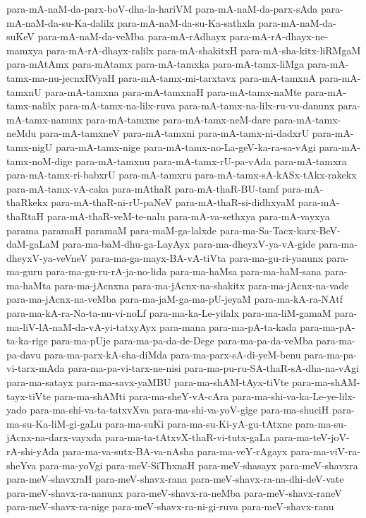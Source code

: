 {para-mA-naM-da-parx-boV-dha-la-hariVM
para-mA-naM-da-parx-sAda
para-mA-naM-da-su-Ka-dalilx
para-mA-naM-da-su-Ka-sathxla
para-mA-naM-da-suKeV
para-mA-naM-da-veMba
para-mA-rAdhayx
para-mA-rA-dhayx-ne-mamxya
para-mA-rA-dhayx-ralilx
para-mA-shakitxH
para-mA-sha-kitx-liRMgaM
para-mAtAmx
para-mAtamx
para-mA-tamxka
para-mA-tamx-liMga
para-mA-tamx-ma-nu-jecnxRVyaH
para-mA-tamx-mi-tarxtavx
para-mA-tamxnA
para-mA-tamxnU
para-mA-tamxna
para-mA-tamxnaH
para-mA-tamx-naMte
para-mA-tamx-nalilx
para-mA-tamx-na-lilx-ruva
para-mA-tamx-na-lilx-ru-vu-danunx
para-mA-tamx-nanunx
para-mA-tamxne
para-mA-tamx-neM-dare
para-mA-tamx-neMdu
para-mA-tamxneV
para-mA-tamxni
para-mA-tamx-ni-dadxrU
para-mA-tamx-nigU
para-mA-tamx-nige
para-mA-tamx-no-La-geV-ka-ra-sa-vAgi
para-mA-tamx-noM-dige
para-mA-tamxnu
para-mA-tamx-rU-pa-vAda
para-mA-tamxra
para-mA-tamx-ri-babxrU
para-mA-tamxru
para-mA-tamx-sA-kASx-tAkx-rakekx
para-mA-tamx-vA-caka
para-mAthaR
para-mA-thaR-BU-tamf
para-mA-thaRkekx
para-mA-thaR-ni-rU-paNeV
para-mA-thaR-si-didhxyaM
para-mA-thaRtaH
para-mA-thaR-veM-te-nalu
para-mA-va-sethxya
para-mA-vayxya
parama
paramaH
paramaM
para-maM-ga-lalxde
para-ma-Sa-Tacx-karx-BeV-daM-gaLaM
para-ma-baM-dhu-ga-LayAyx
para-ma-dheyxV-ya-vA-gide
para-ma-dheyxV-ya-veVneV
para-ma-ga-mayx-BA-vA-tiVta
para-ma-gu-ri-yanunx
para-ma-guru
para-ma-gu-ru-rA-ja-no-lida
para-ma-haMsa
para-ma-haM-sana
para-ma-haMta
para-ma-jAcnxna
para-ma-jAcnx-na-shakitx
para-ma-jAcnx-na-vade
para-ma-jAcnx-na-veMba
para-ma-jaM-ga-ma-pU-jeyaM
para-ma-kA-ra-NAtf
para-ma-kA-ra-Na-ta-nu-vi-noLf
para-ma-ka-Le-yilalx
para-ma-liM-gamaM
para-ma-liV-lA-naM-da-vA-yi-tatxyAyx
para-mana
para-ma-pA-ta-kada
para-ma-pA-ta-ka-rige
para-ma-pUje
para-ma-pa-da-de-Dege
para-ma-pa-da-veMba
para-ma-pa-davu
para-ma-parx-kA-sha-diMda
para-ma-parx-sA-di-yeM-benu
para-ma-pa-vi-tarx-mAda
para-ma-pa-vi-tarx-ne-nisi
para-ma-pu-ru-SA-thaR-sA-dha-na-vAgi
para-ma-satayx
para-ma-savx-yaMBU
para-ma-shAM-tAyx-tiVte
para-ma-shAM-tayx-tiVte
para-ma-shAMti
para-ma-sheY-vA-cAra
para-ma-shi-va-ka-Le-ye-lilx-yado
para-ma-shi-va-ta-tatxvXva
para-ma-shi-va-yoV-gige
para-ma-shuciH
para-ma-su-Ka-liM-gi-gaLu
para-ma-suKi
para-ma-su-Ki-yA-gu-tAtxne
para-ma-su-jAcnx-na-darx-vayxda
para-ma-ta-tAtxvX-thaR-vi-tutx-gaLa
para-ma-teV-joV-rA-shi-yAda
para-ma-va-sutx-BA-va-nAsha
para-ma-veY-rAgayx
para-ma-viV-ra-sheYva
para-ma-yoVgi
para-meV-SiThxnaH
para-meV-shasayx
para-meV-shavxra
para-meV-shavxraH
para-meV-shavx-rana
para-meV-shavx-ra-na-dhi-deV-vate
para-meV-shavx-ra-nanunx
para-meV-shavx-ra-neMba
para-meV-shavx-raneV
para-meV-shavx-ra-nige
para-meV-shavx-ra-ni-gi-ruva
para-meV-shavx-ranu
}
